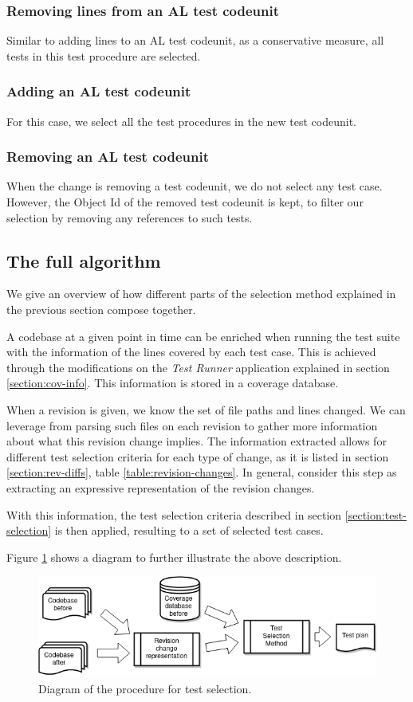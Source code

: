 \documentclass{article}
\begin{document}
\subsubsection{Removing lines from an AL test codeunit}
Similar to adding lines to an AL test codeunit, as a conservative measure, all tests in this test procedure are selected.
\subsubsection{Adding an AL test codeunit}
For this case, we select all the test procedures in the new test codeunit.
\subsubsection{Removing an AL test codeunit}
When the change is removing a test codeunit, we do not select any test case. However, the Object Id of the removed test codeunit is kept, to filter our selection by removing any references to such tests.
\subsection{The full algorithm}
We give an overview of how different parts of the selection method explained in the previous section compose together.

A codebase at a given point in time can be enriched when running the test suite with the information of the lines covered by each test case. This is achieved through the modifications on the \emph{Test Runner} application explained in section \ref{section:cov-info}. This information is stored in a coverage database.

When a revision is given, we know the set of file paths and lines changed. We can leverage from parsing such files on each revision to gather more information about what this revision change implies. The information extracted allows for different test selection criteria for each type of change, as it is listed in section \ref{section:rev-diffs}, table \ref{table:revision-changes}. In general, consider this step as extracting an expressive representation of the revision changes.

With this information, the test selection criteria described in section \ref{section:test-selection} is then applied, resulting to a set of selected test cases.

Figure \ref{fig:testselection} shows a diagram to further illustrate the above description.
\begin{figure}[H]
  \includegraphics[width=\textwidth]{images/testselection.png}
  \caption{Diagram of the procedure for test selection.}
  \label{fig:testselection}
\end{figure}
\end{document}
